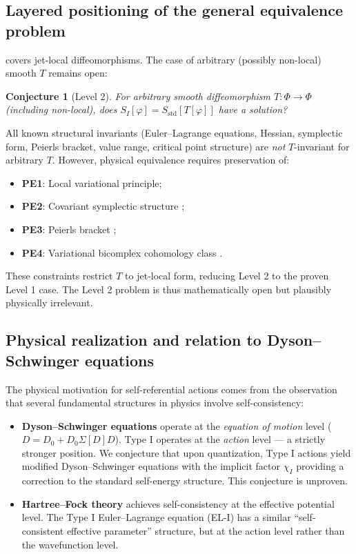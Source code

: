 \documentclass[12pt,letterpaper]{article}
\newtheorem{conjecture}[theorem]{Conjecture}
\theoremstyle{definition}
\newcommand{\mPhi}{\Phi}
\begin{document}
\subsection{Layered positioning of the general equivalence problem}

 covers jet-local diffeomorphisms. The case of arbitrary (possibly non-local) smooth $T$ remains open:

\begin{conjecture}[Level 2]
For \emph{arbitrary} smooth diffeomorphism $T: \mPhi \to \mPhi$ (including non-local), does $S_I[\varphi] = S_{\mathrm{std}}[T[\varphi]]$ have a solution?
\end{conjecture}

All known structural invariants (Euler--Lagrange equations, Hessian, symplectic form, Peierls bracket, value range, critical point structure) are \emph{not} $T$-invariant for arbitrary $T$. However, physical equivalence requires preservation of:
\begin{itemize}
\item \textbf{PE1}: Local variational principle;
\item \textbf{PE2}: Covariant symplectic structure \cite{CrnkovicWitten1987, LeeWald1990, Khavkine2014};
\item \textbf{PE3}: Peierls bracket \cite{HarlowWu2019};
\item \textbf{PE4}: Variational bicomplex cohomology class \cite{Vitolo2001, Olver1993}.
\end{itemize}
These constraints restrict $T$ to jet-local form, reducing Level 2 to the proven Level 1 case. The Level 2 problem is thus mathematically open but plausibly physically irrelevant.

\subsection{Physical realization and relation to Dyson--Schwinger equations}

The physical motivation for self-referential actions comes from the observation that several fundamental structures in physics involve self-consistency:
\begin{itemize}
\item \textbf{Dyson--Schwinger equations} operate at the \emph{equation of motion} level ($D = D_0 + D_0 \Sigma[D] D$). Type I operates at the \emph{action} level --- a strictly stronger position. We conjecture that upon quantization, Type I actions yield modified Dyson--Schwinger equations with the implicit factor $\chi_I$ providing a correction to the standard self-energy structure. This conjecture is unproven.
\item \textbf{Hartree--Fock theory} achieves self-consistency at the effective potential level. The Type I Euler--Lagrange equation (EL-I) has a similar ``self-consistent effective parameter'' structure, but at the action level rather than the wavefunction level.
\end{itemize}
\end{document}
